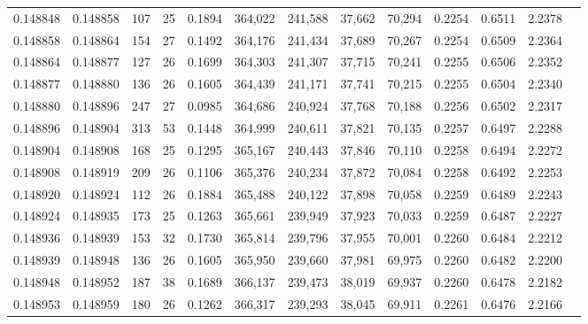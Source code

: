 \begin{tabular}{rrrrrrrrrrrrr}
0.148848 & 0.148858 & 107 &  25 &                                     0.1894 & 364,022 & 241,588 &  37,662 &  70,294 & 0.2254 & 0.6511 & 2.2378 \\
0.148858 & 0.148864 & 154 &  27 &                                     0.1492 & 364,176 & 241,434 &  37,689 &  70,267 & 0.2254 & 0.6509 & 2.2364 \\
0.148864 & 0.148877 & 127 &  26 &                                     0.1699 & 364,303 & 241,307 &  37,715 &  70,241 & 0.2255 & 0.6506 & 2.2352 \\
0.148877 & 0.148880 & 136 &  26 &                                     0.1605 & 364,439 & 241,171 &  37,741 &  70,215 & 0.2255 & 0.6504 & 2.2340 \\
0.148880 & 0.148896 & 247 &  27 &                                     0.0985 & 364,686 & 240,924 &  37,768 &  70,188 & 0.2256 & 0.6502 & 2.2317 \\
0.148896 & 0.148904 & 313 &  53 &                                     0.1448 & 364,999 & 240,611 &  37,821 &  70,135 & 0.2257 & 0.6497 & 2.2288 \\
0.148904 & 0.148908 & 168 &  25 &                                     0.1295 & 365,167 & 240,443 &  37,846 &  70,110 & 0.2258 & 0.6494 & 2.2272 \\
0.148908 & 0.148919 & 209 &  26 &                                     0.1106 & 365,376 & 240,234 &  37,872 &  70,084 & 0.2258 & 0.6492 & 2.2253 \\
0.148920 & 0.148924 & 112 &  26 &                                     0.1884 & 365,488 & 240,122 &  37,898 &  70,058 & 0.2259 & 0.6489 & 2.2243 \\
0.148924 & 0.148935 & 173 &  25 &                                     0.1263 & 365,661 & 239,949 &  37,923 &  70,033 & 0.2259 & 0.6487 & 2.2227 \\
0.148936 & 0.148939 & 153 &  32 &                                     0.1730 & 365,814 & 239,796 &  37,955 &  70,001 & 0.2260 & 0.6484 & 2.2212 \\
0.148939 & 0.148948 & 136 &  26 &                                     0.1605 & 365,950 & 239,660 &  37,981 &  69,975 & 0.2260 & 0.6482 & 2.2200 \\
0.148948 & 0.148952 & 187 &  38 &                                     0.1689 & 366,137 & 239,473 &  38,019 &  69,937 & 0.2260 & 0.6478 & 2.2182 \\
0.148953 & 0.148959 & 180 &  26 &                                     0.1262 & 366,317 & 239,293 &  38,045 &  69,911 & 0.2261 & 0.6476 & 2.2166 \\

\end{tabular}
